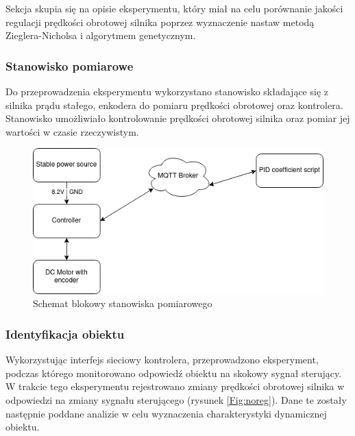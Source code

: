 \documentclass[12pt,twoside]{article}
\begin{document}
Sekcja skupia się na opisie eksperymentu, który miał na celu porównanie jakości regulacji prędkości obrotowej silnika poprzez wyznaczenie nastaw metodą Zieglera-Nicholsa \cite{ZIEGLER} i algorytmem genetycznym.

\subsubsection{Stanowisko pomiarowe}

Do przeprowadzenia eksperymentu wykorzystano stanowisko składające się z silnika prądu stałego, enkodera do pomiaru prędkości obrotowej oraz kontrolera. Stanowisko umożliwiało kontrolowanie prędkości obrotowej silnika oraz pomiar jej wartości w czasie rzeczywistym.

\begin{figure}[ht]%
 \centering%
 \includegraphics[width=12cm]{figures/PID/pidEXP.png}%
 \caption{Schemat blokowy stanowiska pomiarowego}%
 \label{Fig:blockPID}%
\end{figure}

\subsubsection{Identyfikacja obiektu}

Wykorzystując interfejs sieciowy kontrolera, przeprowadzono eksperyment, podczas którego monitorowano odpowiedź obiektu na skokowy sygnał sterujący. W trakcie tego eksperymentu rejestrowano zmiany prędkości obrotowej silnika w odpowiedzi na zmiany sygnału sterującego (rysunek \ref{Fig:noreg}). Dane te zostały następnie poddane analizie w celu wyznaczenia charakterystyki dynamicznej obiektu.
\end{document}
